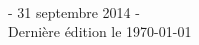 \begin{titlepage}
\begin{minipage}{0.4\textwidth}
\begin{flushright}
\end{flushright}
\end{minipage}\\[2cm]


\vspace{2.2cm}
{\large - 31 septembre 2014 -}\\ \vspace{10pt}
{\large Dernière édition le \today}\\


 

\vfill %

\end{titlepage}


    

